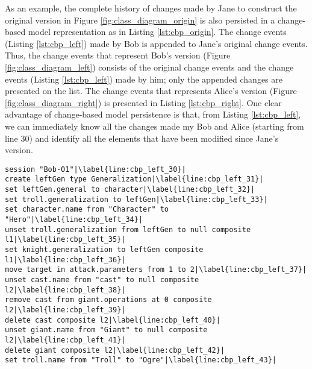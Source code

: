 As an example, the complete history of changes made by Jane to construct the original version in Figure \ref{fig:class_diagram_origin} is also persisted in a change-based model representation as in Listing \ref{lst:cbp_origin}. The change events (Listing \ref{lst:cbp_left}) made by Bob is appended to Jane's original change events. Thus, the change events that represent Bob's version (Figure \ref{fig:class_diagram_left}) consists of the original change events and the change events (Listing \ref{lst:cbp_left}) made by him; only the appended changes are presented on the list. The change events that represents Alice's version (Figure \ref{fig:class_diagram_right}) is presented in Listing \ref{lst:cbp_right}. One clear advantage of change-based model persistence is that, from Listing \ref{lst:cbp_left}, we can immediately know all the changes made my Bob and Alice (starting from line 30) and identify all the elements that have been modified since Jane's version.  

\vspace{-20pt}
\begin{lstlisting}[firstnumber=30,style=eol,escapechar=|,caption={The appended events made by Bob to produce the left version in Figure \ref{fig:class_diagram_left} (left version).},label=lst:cbp_left]
session "Bob-01"|\label{line:cbp_left_30}|
create leftGen type Generalization|\label{line:cbp_left_31}|
set leftGen.general to character|\label{line:cbp_left_32}|
set troll.generalization to leftGen|\label{line:cbp_left_33}|
set character.name from "Character" to "Hero"|\label{line:cbp_left_34}|
unset troll.generalization from leftGen to null composite l1|\label{line:cbp_left_35}|
set knight.generalization to leftGen composite l1|\label{line:cbp_left_36}|
move target in attack.parameters from 1 to 2|\label{line:cbp_left_37}|
unset cast.name from "cast" to null composite l2|\label{line:cbp_left_38}|
remove cast from giant.operations at 0 composite l2|\label{line:cbp_left_39}|
delete cast composite l2|\label{line:cbp_left_40}|
unset giant.name from "Giant" to null composite l2|\label{line:cbp_left_41}|
delete giant composite l2|\label{line:cbp_left_42}|
set troll.name from "Troll" to "Ogre"|\label{line:cbp_left_43}|
\end{lstlisting}

